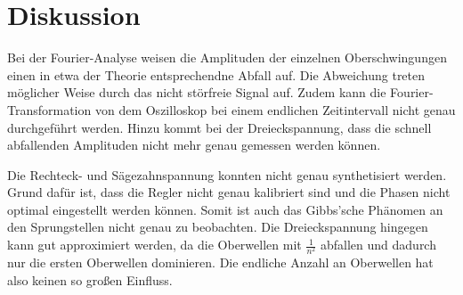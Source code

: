 \section{Diskussion}
\label{sec:Diskussion}

Bei der Fourier-Analyse weisen die Amplituden der einzelnen Oberschwingungen
einen in etwa der Theorie entsprechendne Abfall auf. Die Abweichung treten
möglicher Weise durch das nicht störfreie Signal auf. Zudem kann die Fourier-Transformation
von dem Oszilloskop bei einem endlichen Zeitintervall nicht genau durchgeführt werden.
Hinzu kommt bei der Dreieckspannung, dass die schnell abfallenden Amplituden nicht mehr
genau gemessen werden können.

Die Rechteck- und Sägezahnspannung konnten nicht genau synthetisiert werden.
Grund dafür ist, dass die Regler nicht genau kalibriert sind und die Phasen nicht
optimal eingestellt werden können. Somit ist auch das Gibbs'sche Phänomen an den
Sprungstellen nicht genau zu beobachten. Die Dreieckspannung hingegen kann
gut approximiert werden, da die Oberwellen mit $\frac{1}{n^2}$ abfallen und
dadurch nur die ersten Oberwellen dominieren. Die endliche Anzahl an Oberwellen
hat also keinen so großen Einfluss. 

